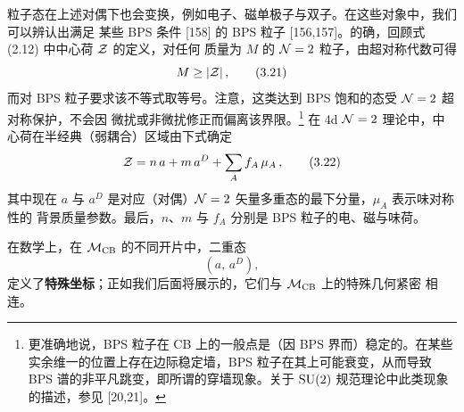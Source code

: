 粒子态在上述对偶下也会变换，例如电子、磁单极子与双子。在这些对象中，我们可以辨认出满足
某些 BPS 条件 [158] 的 BPS 粒子 [156,157]。的确，回顾式 (2.12) 中中心荷 $\mathcal{Z}$ 的定义，对任何
质量为 $M$ 的 $\mathcal{N}=2$ 粒子，由超对称代数可得
\begin{equation}
  M\ge|\mathcal{Z}|\,,
  \tag{3.21}
\end{equation}
而对 BPS 粒子要求该不等式取等号。注意，这类达到 BPS 饱和的态受 $\mathcal{N}=2$ 超对称保护，不会因
微扰或非微扰修正而偏离该界限。\footnote{更准确地说，BPS 粒子在 CB 上的一般点是（因 BPS
界而）稳定的。在某些实余维一的位置上存在边际稳定墙，BPS 粒子在其上可能衰变，从而导致 BPS
谱的非平凡跳变，即所谓的穿墙现象。关于 $\mathrm{SU}(2)$ 规范理论中此类现象的描述，参见 [20,21]。}
在 4d $\mathcal{N}=2$ 理论中，中心荷在半经典（弱耦合）区域由下式确定
\begin{equation}
  \mathcal{Z} = n\,a + m\,a^D + \sum_A f_A\,\mu_A\,,
  \tag{3.22}
\end{equation}
其中现在 $a$ 与 $a^D$ 是对应（对偶）$\mathcal{N}=2$ 矢量多重态的最下分量，$\mu_A$ 表示味对称性的
背景质量参数。最后，$n$、$m$ 与 $f_A$ 分别是 BPS 粒子的电、磁与味荷。

在数学上，在 $\mathcal{M}_{\mathrm{CB}}$ 的不同开片中，二重态
\begin{equation}
  \left(a,\,a^D\right),
  \tag{3.23}
\end{equation}
定义了\textbf{特殊坐标}；正如我们后面将展示的，它们与 $\mathcal{M}_{\mathrm{CB}}$ 上的特殊几何紧密
相连。

